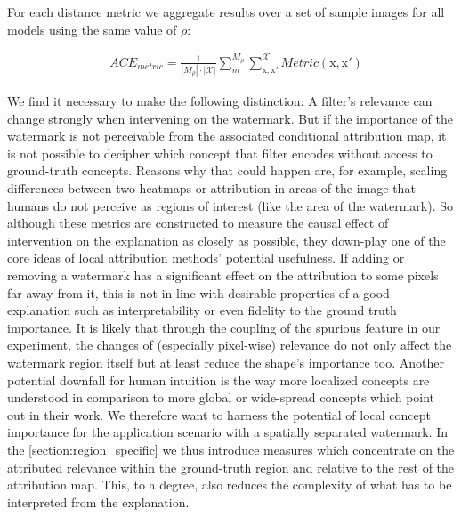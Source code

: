For each distance metric we aggregate results over a set of sample images for all models using the same value of $\rho$:

\begin{align}\label{eq:ace_metric}
& ACE_{metric} = \frac{1}{|M_\rho|\cdot |\mathcal{X}| }\sum_{m}^{M_{\rho}} \sum_{\mathrm{x,x'}}^{\mathcal{X}} Metric(\mathrm{x,x'})
\end{align}

We find it necessary to make the following distinction: A filter's relevance can change strongly when intervening on the watermark. But if the importance of the watermark is not perceivable from the associated conditional attribution map, it is not possible to decipher which concept that filter encodes without access to ground-truth concepts. Reasons why that could happen are, for example, scaling differences between two heatmaps or attribution in areas of the image that humans do not perceive as regions of interest (like the area of the watermark).
So although these metrics are constructed to measure the causal effect of intervention on the explanation as closely as possible, they down-play one of the core ideas of local attribution methods' potential usefulness. If adding or removing a watermark has a significant effect on the attribution to some pixels far away from it, this is not in line with desirable properties of a good explanation such as interpretability or even fidelity to the ground truth importance. It is likely that through the coupling of the spurious feature in our experiment, the changes of (especially pixel-wise) relevance do not only affect the watermark region itself but at least reduce the shape's importance too. 
Another potential downfall for human intuition is the way more localized concepts are understood in comparison to more global or wide-spread concepts which \citet{Achtibat2022} point out in their work. We therefore want to harness the potential of local concept importance for the application scenario with a spatially separated watermark.
In the \cref{section:region_specific} we thus introduce measures which concentrate on the attributed relevance within the ground-truth region and relative to the rest of the attribution map. This, to a degree, also reduces the complexity of what has to be interpreted from the explanation.
